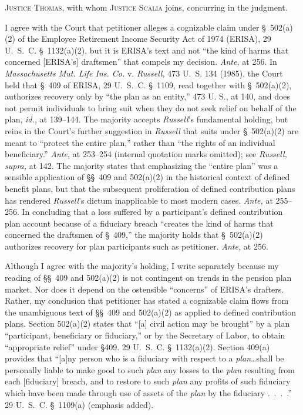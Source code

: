 
\setcounter{page}{260}

  \textsc{Justice Thomas,} with whom \textsc{Justice Scalia} joins, concurring in the judgment.

  I agree with the Court that petitioner alleges a cognizable claim under \S~502(a)(2) of the Employee Retirement Income Security Act of 1974 (ERISA), 29 U.~S.~C. \S~1132(a)(2), but it is ERISA's text and not ``the kind of harms that concerned [ERISA's] draftsmen'' that compels my decision. \emph{Ante,} at 256. In \emph{Massachusetts Mut. Life Ins. Co.} v. \emph{Russell,} 473 U.~S. 134 (1985), the Court held that \S~409 of ERISA, 29 U.~S.~C. \S~1109, read together with \S~502(a)(2), authorizes recovery only by ``the plan as an entity,'' 473 U. S., at 140, and does not permit individuals to bring suit when they do not seek relief on behalf of the plan, \emph{id.,} at 139--144. The majority accepts \emph{Russell}'s fundamental holding, but reins in the Court's further suggestion in \emph{Russell} that suits under \S~502(a)(2) are meant to ``protect the entire plan,'' rather than ``the rights of an individual beneficiary.'' \emph{Ante,} at 253--254 (internal quotation marks omitted); see \emph{Russell, supra,} at 142. The majority states that emphasizing the ``entire plan'' was a sensible application of \S\S~409 and 502(a)(2) in the historical context of defined benefit plans, but that the subsequent proliferation of defined contribution plans has rendered \emph{Russell}'s dictum inapplicable to most modern cases. \newpage  \emph{Ante,} at 255--256. In concluding that a loss suffered by a participant's defined contribution plan account because of a fiduciary breach ``creates the kind of harms that concerned the draftsmen of \S~409,'' the majority holds that \S~502(a)(2) authorizes recovery for plan participants such as petitioner. \emph{Ante,} at 256.

  Although I agree with the majority's holding, I write separately because my reading of \S\S~409 and 502(a)(2) is not contingent on trends in the pension plan market. Nor does it depend on the ostensible ``concerns'' of ERISA's drafters. Rather, my conclusion that petitioner has stated a cognizable claim flows from the unambiguous text of \S\S~409 and 502(a)(2) as applied to defined contribution plans. Section 502(a)(2) states that ``[a] civil action may be brought'' by a plan ``participant, beneficiary or fiduciary,'' or by the Secretary of Labor, to obtain ``appropriate relief'' under \S409. 29 U.~S.~C. \S~1132(a)(2). Section 409(a) provides that ``[a]ny person who is a fiduciary with respect to a \emph{plan}\dots shall be personally liable to make good to such \emph{plan} any losses to the \emph{plan} resulting from each [fiduciary] breach, and to restore to such \emph{plan} any profits of such fiduciary which have been made through use of assets of the \emph{plan} by the fiduciary .~.~.~.'' 29 U.~S.~C. \S~1109(a) (emphasis added).

